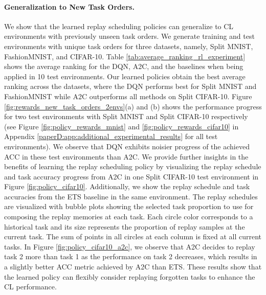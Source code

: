 \paragraph{Generalization to New Task Orders.} 
We show that the learned replay scheduling policies can generalize to CL environments with previously unseen task orders. We generate training and test environments with unique task orders for three datasets, namely, Split MNIST, FashionMNIST, and CIFAR-10. Table \ref{tab:average_ranking_rl_experiment} shows the average ranking for the DQN, A2C, and the baselines when being applied in 10 test environments. 
Our learned policies obtain the best average ranking across the datasets, where the DQN performs best for Split MNIST and FashionMNIST while A2C outperforms all methods on Split CIFAR-10. Figure \ref{fig:rewards_new_task_orders_2envs}(a) and (b) shows the performance progress for two test environments with Split MNIST and Split CIFAR-10 respectively (see Figure \ref{fig:policy_rewards_mnist} and \ref{fig:policy_rewards_cifar10} in Appendix \ref{paperD:app:additional_experimental_results} for all test environments). We observe that DQN exhibits noisier progress of the achieved ACC in these test environments than A2C. 
We provide further insights in the benefits of learning the replay scheduling policy by visualizing the replay schedule and task accuracy progress from A2C in one Split CIFAR-10 test environment in Figure \ref{fig:policy_cifar10}. Additionally, we show the replay schedule and task accuracies from the ETS baseline in the same environment. The replay schedules are visualized with bubble plots showing the selected task proportion to use for composing the replay memories at each task. Each circle color corresponds to a historical task and its size represents the proportion of replay samples at the current task. The sum of points in all circles at each column is fixed at all current tasks. In Figure \ref{fig:policy_cifar10_a2c}, we observe that A2C decides to replay task 2 more than task 1 as the performance on task 2 decreases, which results in a slightly better ACC metric achieved by A2C than ETS. These results show that the learned policy can flexibly consider replaying forgotten tasks to enhance the CL performance.



\vspace{-3mm}
